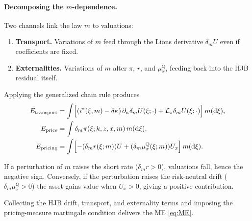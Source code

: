 \documentclass[11pt,letterpaper,oneside]{article}
\newcommand{\diff}{\mathrm{d}}
\newcommand{\Lz}{\mathcal{L}_z}
\newcommand{\muxQ}{\mu_x^{\mathbb{Q}}}
\newcommand{\dmU}{\delta_m U}
\begin{document}
\paragraph{Decomposing the $m$-dependence.}
Two channels link the law $m$ to valuations:
\begin{enumerate}[label=(\roman*), leftmargin=1.5em]
    \item \textbf{Transport.} Variations of $m$ feed through the Lions derivative $\dmU$ even if coefficients are fixed.
    \item \textbf{Externalities.} Variations of $m$ alter $\pi$, $r$, and $\muxQ$, feeding back into the HJB residual itself.
\end{enumerate}
Applying the generalized chain rule produces
\begin{align*}
E_{\text{transport}} &= \int \Bigl[(i^*(\xi,m)-\delta\kappa)\,\partial_{\kappa}\dmU(\xi;\cdot) + \Lz \dmU(\xi;\cdot)\Bigr]\,m(\diff \xi),\\
E_{\text{price}} &= \int \delta_m \pi(\xi; k,z,x,m)\,m(\diff \xi),\\
E_{\text{pricing}} &= \int \Bigl[-(\delta_m r(\xi; m)) U + (\delta_m \muxQ(\xi; m)) U_x \Bigr]\,m(\diff \xi).
\end{align*}

\begin{tcolorbox}[didacticstyle,title={Sign intuition}]
If a perturbation of $m$ raises the short rate ($\delta_m r>0$), valuations fall, hence the negative sign. Conversely, if the perturbation raises the risk-neutral drift ($\delta_m \muxQ>0$) the asset gains value when $U_x>0$, giving a positive contribution.
\end{tcolorbox}

Collecting the HJB drift, transport, and externality terms and imposing the pricing-measure martingale condition delivers the ME \eqref{eq:ME}.
\end{document}
